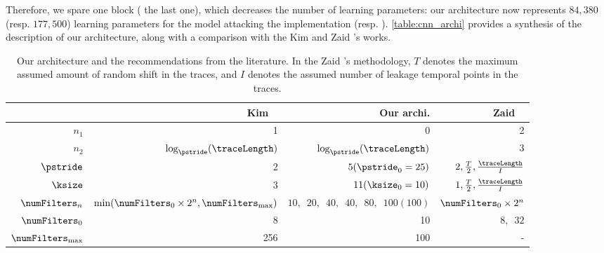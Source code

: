 Therefore, we spare one block (\ie{} the last one), which decreases the number of learning parameters: our architecture now represents \(84,380\) (resp. \(177,500\)) learning parameters for the model attacking the \mbedTLS{} implementation (resp. \aeshuitbit{}).
\autoref{table:cnn_archi} provides a synthesis of the description of our architecture, along with a comparison with the Kim \etal{} and Zaid \etal{}'s works.
\begin{table}[h]
	\centering
	\caption{Our architecture and the recommendations from the literature.
	In the Zaid \etal{}'s methodology, \(T\) denotes the maximum assumed amount of random shift in the traces, and \(I\) denotes the assumed number of leakage temporal points in the traces.}
	\begin{tabular}{rrrr}
		\toprule
		& Kim \etal{}~\cite{kim_make_2019} & \(\enspace \) Our archi. & \enspace Zaid \etal{}~\cite{zaid_methodology_2019} \vspace{5pt}\\
		\midrule
		\(n_1\) & 1 & 0 & 2\\
		\(n_2\) & \(\log_{\pstride}(\traceLength)\) & \(\log_{\pstride}(\traceLength)\) & 3 \vspace{5pt}\\
		\(\pstride\) & 2 & \(5 (\pstride_0 = 25)\) & \(2, \frac{T}{2}, \frac{\traceLength}{I}\) \vspace{5pt}\\
		\(\ksize\) & 3 & \(11 (\ksize_0 = 10)\) & \(1, \frac{T}{2}, \frac{\traceLength}{I}\) \vspace{5pt}\\
		\(\numFilters_n\) & \(\min(\numFilters_0\times2^n, \numFilters_{\max})\) & \(10, \enspace 20, \enspace 40, \enspace 40, \enspace 80, \enspace 100 (100)\) & \(\numFilters_0\times2^n\) \vspace{5pt}\\
		\(\numFilters_0\) & 8 & 10 & \(8, \enspace 32\) \vspace{5pt}\\
		\(\numFilters_{\max}\) & 256 & 100 & - \vspace{5pt}\\
		\bottomrule
	\end{tabular}
	\label{table:cnn_archi}
\end{table}

